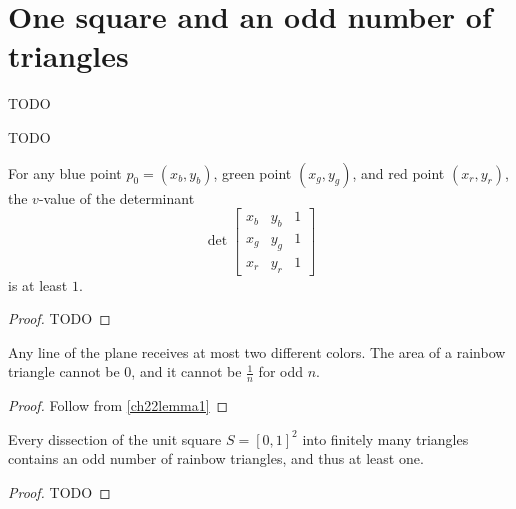 \chapter{One square and an odd number of triangles}


\begin{definition}
  \label{valuation}
\end{definition}

\begin{definition}
  \label{three_coloring}
  TODO
\end{definition}

\begin{definition}
  \label{rainbow_triangle}
  TODO
\end{definition}


\begin{lemma}
  \label{ch22lemma1}
  For any blue point $p_0 = (x_b, y_b)$, green point $(x_g, y_g)$, and
  red point $(x_r, y_r)$, the $v$-value of the determinant
  \[
  \det \begin{bmatrix}
    x_b & y_b & 1 \\
    x_g & y_g & 1 \\
    x_r & y_r & 1
  \end{bmatrix}
  \] is at least $1$.
\end{lemma}
\begin{proof}
  TODO
\end{proof}

\begin{corollary}
  \label{ch22corollary}
  Any line of the plane receives at most two different colors.
  The area of a rainbow triangle cannot be $0$, and it cannot be
  $\frac{1}{n}$ for odd $n$.
\end{corollary}
\begin{proof}
  Follow from \ref{ch22lemma1}
\end{proof}

\begin{lemma}
  \label{ch22lemma2}
  Every dissection of the unit square $S = [0, 1]^2$ into finitely
  many triangles contains an odd number of rainbow triangles, and thus at least one.
\end{lemma}
\begin{proof}
  TODO
\end{proof}


